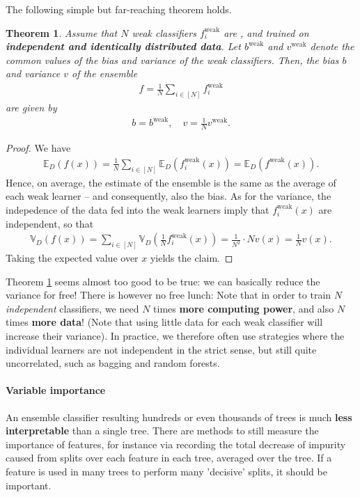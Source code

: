 \documentclass{article}
\newcommand{\erw}{\mathbb{E}} %
\newtheorem{theorem}{Theorem}
\begin{document}
The following simple but far-reaching theorem holds.
\begin{theorem} \label{th:ensemble}
    Assume that $N$ weak classifiers $f_i^{\mathrm{weak}}$ are , and trained on \textbf{independent and identically distributed data}. Let $b^{\mathrm{weak}}$ and $v^{\mathrm{weak}}$ denote the common values of the bias and variance of the weak classifiers. Then, the bias $b$ and variance $v$ of the ensemble 
    \begin{align*}
        f = \frac{1}{N} \sum_{i \in [N]}f_i^{\mathrm{weak}}
    \end{align*}
    are given by
    \begin{align*}
        b = b^{\mathrm{weak}}, \quad v = \frac{1}{N}v^{\mathrm{weak}}.
    \end{align*}
\end{theorem}
\begin{proof}
    We have 
\begin{align*}
   \erw_D(f(x)) = \frac{1}{N}\sum_{i\in [N]}\erw_D(f_i^{\mathrm{weak}}(x)) = \erw_D(f^{\mathrm{weak}}(x)).
\end{align*}
Hence, on average, the estimate of the ensemble is the same as the average of each weak learner -- and consequently, also the bias. As for the variance, the indepedence of the data fed into the weak learners imply that $f_i^\mathrm{weak}(x)$ are independent, so that
\begin{align*}
    \mathbb{V}_D(f(x)) = \sum_{i\in [N]}\mathbb{V}_D(\tfrac{1}{N}f_i^{\mathrm{weak}}(x)) = \frac{1}{N^2} \cdot N v(x) = \frac{1}{N}v(x).
\end{align*}
Taking the expected value over $x$ yields the claim.
\end{proof}
Theorem \ref{th:ensemble} seems almost too good to be true: we can basically reduce the variance for free! There is however no free lunch: Note that in order to train $N$ \emph{independent} classifiers, we need $N$ times \textbf{more computing power}, and also $N$ times \textbf{more data}! (Note that using little data for each weak classifier will increase their variance). In practice, we therefore often use strategies where the individual learners are not independent in the strict sense, but still quite uncorrelated, such as bagging and random forests.

\paragraph{Variable importance} An ensemble classifier resulting hundreds or even thousands of trees is much \textbf{less interpretable} than a single tree. There are methods to still measure the importance of features, for instance via recording the total decrease of impurity caused from splits over each feature in each tree, averaged over the tree. If a feature is used in many trees to perform many 'decisive' splits, it should be important.
\end{document}
